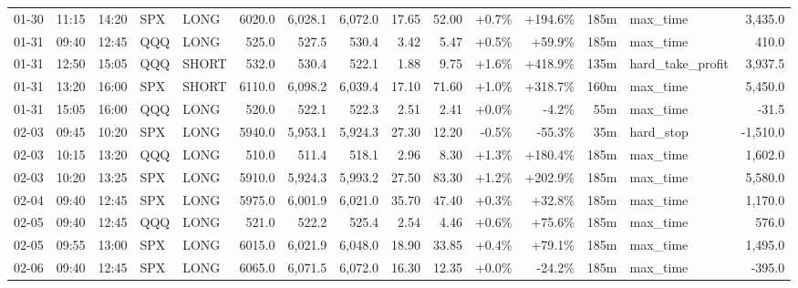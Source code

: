 \documentclass[11pt,a4paper,twoside]{article}
\begin{document}
\begin{landscape}
\begin{center}
\begin{longtable}{>{\color{txtmain}}l l l l l r r r r r r r r >{\color{txtmain}}l r}
01-30 & 11:15 & 14:20 & SPX & LONG & 6020.0 & 6,028.1 & 6,072.0 & 17.65 & 52.00 & \textcolor{wingreen}{+0.7\%} & \textcolor{wingreen}{+194.6\%} & 185m & max\_time & \textcolor{wingreen}{3,435.0} \\
01-31 & 09:40 & 12:45 & QQQ & LONG & 525.0 & 527.5 & 530.4 & 3.42 & 5.47 & \textcolor{wingreen}{+0.5\%} & \textcolor{wingreen}{+59.9\%} & 185m & max\_time & \textcolor{wingreen}{410.0} \\
01-31 & 12:50 & 15:05 & QQQ & SHORT & 532.0 & 530.4 & 522.1 & 1.88 & 9.75 & \textcolor{wingreen}{+1.6\%} & \textcolor{wingreen}{+418.9\%} & 135m & hard\_take\_profit & \textcolor{wingreen}{3,937.5} \\
01-31 & 13:20 & 16:00 & SPX & SHORT & 6110.0 & 6,098.2 & 6,039.4 & 17.10 & 71.60 & \textcolor{wingreen}{+1.0\%} & \textcolor{wingreen}{+318.7\%} & 160m & max\_time & \textcolor{wingreen}{5,450.0} \\
01-31 & 15:05 & 16:00 & QQQ & LONG & 520.0 & 522.1 & 522.3 & 2.51 & 2.41 & \textcolor{wingreen}{+0.0\%} & \textcolor{lossred}{-4.2\%} & 55m & max\_time & \textcolor{lossred}{-31.5} \\
02-03 & 09:45 & 10:20 & SPX & LONG & 5940.0 & 5,953.1 & 5,924.3 & 27.30 & 12.20 & \textcolor{lossred}{-0.5\%} & \textcolor{lossred}{-55.3\%} & 35m & hard\_stop & \textcolor{lossred}{-1,510.0} \\
02-03 & 10:15 & 13:20 & QQQ & LONG & 510.0 & 511.4 & 518.1 & 2.96 & 8.30 & \textcolor{wingreen}{+1.3\%} & \textcolor{wingreen}{+180.4\%} & 185m & max\_time & \textcolor{wingreen}{1,602.0} \\
02-03 & 10:20 & 13:25 & SPX & LONG & 5910.0 & 5,924.3 & 5,993.2 & 27.50 & 83.30 & \textcolor{wingreen}{+1.2\%} & \textcolor{wingreen}{+202.9\%} & 185m & max\_time & \textcolor{wingreen}{5,580.0} \\
02-04 & 09:40 & 12:45 & SPX & LONG & 5975.0 & 6,001.9 & 6,021.0 & 35.70 & 47.40 & \textcolor{wingreen}{+0.3\%} & \textcolor{wingreen}{+32.8\%} & 185m & max\_time & \textcolor{wingreen}{1,170.0} \\
02-05 & 09:40 & 12:45 & QQQ & LONG & 521.0 & 522.2 & 525.4 & 2.54 & 4.46 & \textcolor{wingreen}{+0.6\%} & \textcolor{wingreen}{+75.6\%} & 185m & max\_time & \textcolor{wingreen}{576.0} \\
02-05 & 09:55 & 13:00 & SPX & LONG & 6015.0 & 6,021.9 & 6,048.0 & 18.90 & 33.85 & \textcolor{wingreen}{+0.4\%} & \textcolor{wingreen}{+79.1\%} & 185m & max\_time & \textcolor{wingreen}{1,495.0} \\
02-06 & 09:40 & 12:45 & SPX & LONG & 6065.0 & 6,071.5 & 6,072.0 & 16.30 & 12.35 & \textcolor{wingreen}{+0.0\%} & \textcolor{lossred}{-24.2\%} & 185m & max\_time & \textcolor{lossred}{-395.0} \\

\end{longtable}
\end{center}
\end{landscape}
\end{document}
